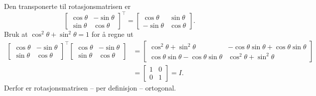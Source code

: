 \documentclass[titlepage,a4paper,12pt,norsk]{IMFeksamen}
\newcommand{\tr}{^\top}
\newcommand{\0}{\V{0}}
\begin{document}
\begin{oppgave}
Den transponerte til rotasjonsmatrisen er
\[
\begin{bmatrix}
\cos \theta  & -\sin \theta  \\  \sin \theta & \cos \theta 
\end{bmatrix}\tr 
=
\begin{bmatrix}
\cos \theta  & \sin \theta  \\  -\sin \theta & \cos \theta 
\end{bmatrix}.
\]
Bruk at $\cos ^2 \theta +\sin^2 \theta =1$ for å regne ut
\begin{align*}
\begin{bmatrix}
\cos \theta  & -\sin \theta  \\  \sin \theta & \cos \theta 
\end{bmatrix}\tr 
\begin{bmatrix}
\cos \theta  & -\sin \theta  \\  \sin \theta & \cos \theta 
\end{bmatrix}
&=
\begin{bmatrix}
\cos^2 \theta +\sin^2 \theta   & -\cos\theta \sin \theta  +\cos\theta \sin \theta \\  
\cos\theta \sin \theta  -\cos\theta \sin \theta& \cos^2 \theta +\sin^2\theta
\end{bmatrix}\\
&=
\begin{bmatrix}
1 & 0 \\
0 & 1
\end{bmatrix}
=I.
\end{align*}
Derfor er rotasjonsmatrisen -- per definisjon -- ortogonal.


\end{oppgave}
\end{document}
